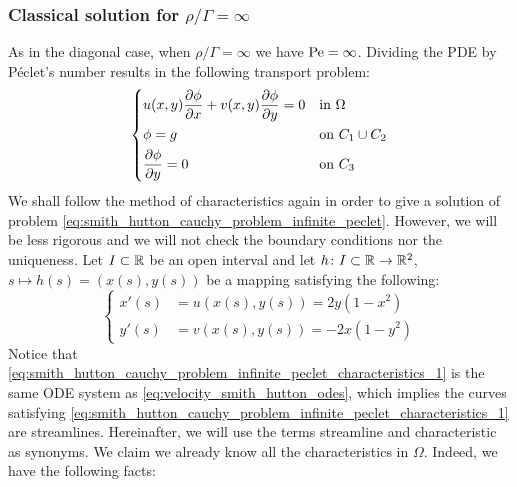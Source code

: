 \subsubsection{Classical solution for \texorpdfstring{$\rho / \Gamma =
\infty$}{infinite rho/Gamma quotient}}

As in the diagonal case, when $\rho / \Gamma = \infty$ we have $\mathrm{Pe} =
\infty$. Dividing the PDE by Péclet's number results in the following transport
problem:
\begin{equation} \label{eq:smith_hutton_cauchy_problem_infinite_peclet} 
	\left\{
	\begin{aligned}
		&u(x,y) \pdv{\phi}{x} + v(x,y) \pdv{\phi}{y} = 0 &
		&\text{in } \Omega \\
		&\phi = g & 
		&\text{on } C_1 \cup C_2 \\
		&\frac{\partial \phi}{\partial y} = 0 & 
		&\text{on } C_3
	\end{aligned}
	\right.
\end{equation}
We shall follow the method of characteristics again in order to give a solution
of problem \eqref{eq:smith_hutton_cauchy_problem_infinite_peclet}. However, we
will be less rigorous and we will not check the boundary conditions nor the
uniqueness. Let $I \subset \mathbb{R}$ be an open interval and let $h \colon I
\subset \mathbb{R} \to \mathbb{R}^2$, $s \mapsto h(s) = (x(s), y(s))$ be a mapping
satisfying the following:
\begin{equation} \label{eq:smith_hutton_cauchy_problem_infinite_peclet_characteristics_1} 
	\left\{
	\begin{aligned}
		x'(s) &= u(x(s), y(s)) = 2 y (1 - x^2) \\
		y'(s) &= v(x(s), y(s)) = - 2 x (1 - y^2)
	\end{aligned}
	\right.
\end{equation}
Notice that
\eqref{eq:smith_hutton_cauchy_problem_infinite_peclet_characteristics_1} is the
same ODE system as \eqref{eq:velocity_smith_hutton_odes}, which implies the
curves satisfying
\eqref{eq:smith_hutton_cauchy_problem_infinite_peclet_characteristics_1} are
streamlines. Hereinafter, we will use the terms streamline and characteristic as
synonyms. We claim we already know all the characteristics in $\Omega$. Indeed,
we have the following facts:
